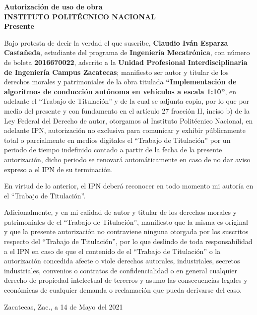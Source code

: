 \documentclass[12pt, letterpaper, oneside]{book}
\begin{document}
	\thispagestyle{empty}
	
	\thispagestyle{empty}
	
	\thispagestyle{empty}
	\begin{center}
		{\bf Autorización de uso de obra\\
			INSTITUTO POLITÉCNICO NACIONAL\\
			Presente}\\
	\end{center}
	
	Bajo protesta de decir la verdad el que suscribe, {\bf Claudio Iván Esparza Castañeda}, estudiante del programa de {\bf Ingeniería Mecatrónica}, con número de boleta {\bf 2016670022}, adscrito a la {\bf Unidad Profesional Interdisciplinaria de Ingeniería Campus Zacatecas}; manifiesto ser autor y titular de los derechos morales y patrimoniales de la obra titulada {\bf ``Implementación de algoritmos de conducción autónoma en vehículos a escala 1:10''}, en adelante el ``Trabajo de Titulación'' y de la cual se adjunta copia, por lo que por medio del presente y con fundamento en el artículo 27 fracción II, inciso b) de la Ley Federal del Derecho de autor, otorgamos al Instituto Politécnico Nacional, en adelante IPN, autorización no exclusiva para comunicar y exhibir públicamente total o parcialmente en medios digitales el ``Trabajo de Titulación'' por un periodo de tiempo indefinido contado a partir de la fecha de la presente autorización, dicho periodo se renovará automáticamente en caso de no dar aviso expreso a el IPN de su terminación.
	\par En virtud de lo anterior, el IPN deberá reconocer en todo momento mi autoría en el ``Trabajo de Titulación''.
	\par Adicionalmente, y en mi calidad de autor y titular de los derechos morales y patrimoniales de el ``Trabajo de Titulación'', manifiesto que la misma es original y que la presente autorización no contraviene ninguna otorgada por los suscritos respecto del ``Trabajo de Titulación'', por lo que deslindo de toda responsabilidad a el IPN en caso de que el contenido de el ``Trabajo de Titulación'' o la autorización concedida afecte o viole derechos autorales, industriales, secretos industriales, convenios o contratos de confidencialidad o en general cualquier derecho de propiedad intelectual de terceros y asumo las consecuencias legales y económicas de cualquier demanda o reclamación que pueda derivarse del caso.
	\begin{flushright}
		Zacatecas, Zac., a 14 de Mayo del 2021
	\end{flushright}
\end{document}
